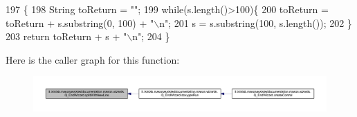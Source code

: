 \begin{DoxyCode}
197                                               \{
198         String toReturn = \textcolor{stringliteral}{""};
199         \textcolor{keywordflow}{while}(s.length()>100)\{
200             toReturn = toReturn + s.substring(0, 100) + \textcolor{stringliteral}{"\(\backslash\)n"};
201             s = s.substring(100, s.length());
202         \}
203         \textcolor{keywordflow}{return} toReturn + s + \textcolor{stringliteral}{"\(\backslash\)n"};
204     \}
\end{DoxyCode}


Here is the caller graph for this function\-:
\nopagebreak
\begin{figure}[H]
\begin{center}
\leavevmode
\includegraphics[width=350pt]{classit_1_1isislab_1_1masonassisteddocumentation_1_1mason_1_1wizards_1_1_q___end_wizard_a89adac239da36e67abac1ec9c416bba4_icgraph}
\end{center}
\end{figure}




